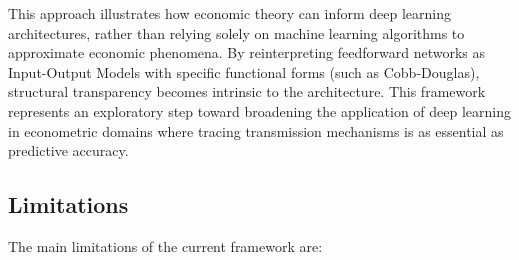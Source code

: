 \documentclass[preprint,12pt,authoryear]{sn-jnl}
\begin{document}
This approach illustrates how economic theory can inform deep learning architectures, rather than relying solely on machine learning algorithms to approximate economic phenomena. By reinterpreting feedforward networks as Input-Output Models with specific functional forms (such as Cobb-Douglas), structural transparency becomes intrinsic to the architecture. This framework represents an exploratory step toward broadening the application of deep learning in econometric domains where tracing transmission mechanisms is as essential as predictive accuracy.

\subsection{Limitations}

The main limitations of the current framework are:
\end{document}
